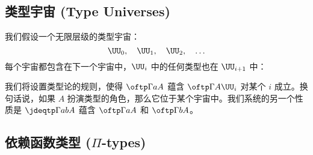 %
%

\subsection{类型宇宙 (Type Universes)}

%

我们假设一个无限层级的类型宇宙：
%
\begin{equation*}
  \UU_0, \quad \UU_1, \quad  \UU_2, \quad \ldots
\end{equation*}
%
每个宇宙都包含在下一个宇宙中，$\UU_i$ 中的任何类型也在 $\UU_{i+1}$ 中：
%
%
我们将设置类型论的规则，使得 $\oftp\Gamma{a}{A}$ 蕴含 $\oftp\Gamma{A}{\UU_i}$ 对某个 $i$ 成立。换句话说，如果 $A$ 扮演类型的角色，那么它位于某个宇宙中。我们系统的另一个性质是 $\jdeqtp\Gamma{a}{b}{A}$ 蕴含 $\oftp\Gamma{a}{A}$ 和 $\oftp\Gamma{b}{A}$。

\subsection{依赖函数类型 (\texorpdfstring{$\Pi$}{Π}-types)}
\label{sec:more-formal-pi}

%
%

